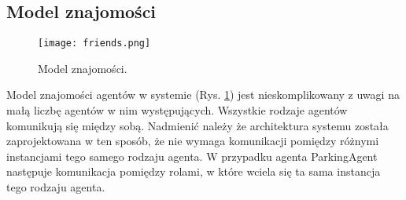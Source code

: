 

\newpage
\subsection{Model znajomości}

\begin{figure}[h!]
    \centering \texttt{[image: friends.png]}
    \caption{Model znajomości.}
    \label{fig:friends}
\end{figure}

Model znajomości agentów w systemie (Rys. \ref{fig:friends}) jest nieskomplikowany z uwagi na małą liczbę agentów w nim występujących. Wszystkie rodzaje agentów komunikują się między sobą. Nadmienić należy że architektura systemu została zaprojektowana w ten sposób, że nie wymaga komunikacji pomiędzy różnymi instancjami tego samego rodzaju agenta. W przypadku agenta ParkingAgent następuje komunikacja pomiędzy rolami, w które wciela się ta sama instancja tego rodzaju agenta.
